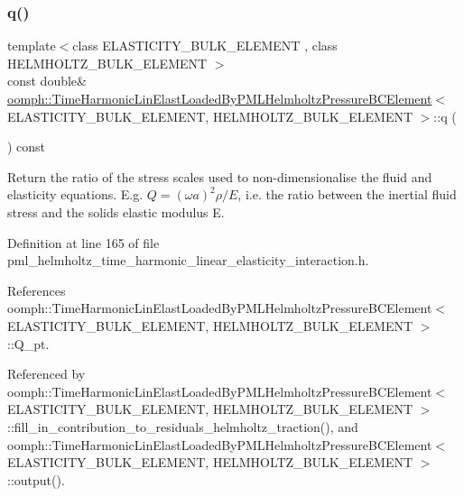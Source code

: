 \subsubsection{\texorpdfstring{q()}{q()}}
{\footnotesize\ttfamily template$<$class E\+L\+A\+S\+T\+I\+C\+I\+T\+Y\+\_\+\+B\+U\+L\+K\+\_\+\+E\+L\+E\+M\+E\+NT , class H\+E\+L\+M\+H\+O\+L\+T\+Z\+\_\+\+B\+U\+L\+K\+\_\+\+E\+L\+E\+M\+E\+NT $>$ \\
const double\& \hyperlink{classoomph_1_1TimeHarmonicLinElastLoadedByPMLHelmholtzPressureBCElement}{oomph\+::\+Time\+Harmonic\+Lin\+Elast\+Loaded\+By\+P\+M\+L\+Helmholtz\+Pressure\+B\+C\+Element}$<$ E\+L\+A\+S\+T\+I\+C\+I\+T\+Y\+\_\+\+B\+U\+L\+K\+\_\+\+E\+L\+E\+M\+E\+NT, H\+E\+L\+M\+H\+O\+L\+T\+Z\+\_\+\+B\+U\+L\+K\+\_\+\+E\+L\+E\+M\+E\+NT $>$\+::q (\begin{DoxyParamCaption}{ }\end{DoxyParamCaption}) const\hspace{0.3cm}{\ttfamily [inline]}}



Return the ratio of the stress scales used to non-\/dimensionalise the fluid and elasticity equations. E.\+g. $ Q = (\omega a)^2 \rho/E $, i.\+e. the ratio between the inertial fluid stress and the solid\textquotesingle{}s elastic modulus E. 



Definition at line 165 of file pml\+\_\+helmholtz\+\_\+time\+\_\+harmonic\+\_\+linear\+\_\+elasticity\+\_\+interaction.\+h.



References oomph\+::\+Time\+Harmonic\+Lin\+Elast\+Loaded\+By\+P\+M\+L\+Helmholtz\+Pressure\+B\+C\+Element$<$ E\+L\+A\+S\+T\+I\+C\+I\+T\+Y\+\_\+\+B\+U\+L\+K\+\_\+\+E\+L\+E\+M\+E\+N\+T, H\+E\+L\+M\+H\+O\+L\+T\+Z\+\_\+\+B\+U\+L\+K\+\_\+\+E\+L\+E\+M\+E\+N\+T $>$\+::\+Q\+\_\+pt.



Referenced by oomph\+::\+Time\+Harmonic\+Lin\+Elast\+Loaded\+By\+P\+M\+L\+Helmholtz\+Pressure\+B\+C\+Element$<$ E\+L\+A\+S\+T\+I\+C\+I\+T\+Y\+\_\+\+B\+U\+L\+K\+\_\+\+E\+L\+E\+M\+E\+N\+T, H\+E\+L\+M\+H\+O\+L\+T\+Z\+\_\+\+B\+U\+L\+K\+\_\+\+E\+L\+E\+M\+E\+N\+T $>$\+::fill\+\_\+in\+\_\+contribution\+\_\+to\+\_\+residuals\+\_\+helmholtz\+\_\+traction(), and oomph\+::\+Time\+Harmonic\+Lin\+Elast\+Loaded\+By\+P\+M\+L\+Helmholtz\+Pressure\+B\+C\+Element$<$ E\+L\+A\+S\+T\+I\+C\+I\+T\+Y\+\_\+\+B\+U\+L\+K\+\_\+\+E\+L\+E\+M\+E\+N\+T, H\+E\+L\+M\+H\+O\+L\+T\+Z\+\_\+\+B\+U\+L\+K\+\_\+\+E\+L\+E\+M\+E\+N\+T $>$\+::output().

